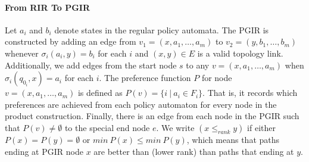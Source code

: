 \documentclass[10pt]{sigalternate052015}
\newcommand{\para}[1]{\paragraph*{\textbf{#1}}}
\newcommand{\set}[1]{\ensuremath{\{ #1 \} }}
\begin{document}
\para{From RIR To PGIR}

Let $a_i$ and $b_i$ denote states in the regular policy automata.
The PGIR is constructed by adding an edge from $v_1 = (x, a_1, \dots, a_m)$ to $v_2 = (y, b_1, \dots, b_m)$ whenever $\sigma_i(a_i, y) = b_i$ for each $i$ and $(x,y) \in E$ is a valid topology link.
%
Additionally, we add edges from the start node $s$ to any $v = (x, a_1, \dots, a_m)$ when $\sigma_i(q_{0_i}, x) = a_i$ for each $i$.
%
The preference function $P$ for node $v = (x, a_1, \dots, a_m)$ is defined as $P(v) = \set{i~\vert~a_i \in F_i} $. That is, it records which preferences are achieved from each policy automaton for every node in the product construction.
%
Finally, there is an edge from each node in the PGIR such that $P(v) \neq \emptyset$ to the special end node $e$. We write $(x \leq_{rank} y)$ if either $P(x) = P(y) = \emptyset$ or $min ~ P(x) \leq min ~ P(y)$, which means that paths ending at PGIR node $x$ are better than (lower rank) than paths that ending at $y$.
\end{document}
